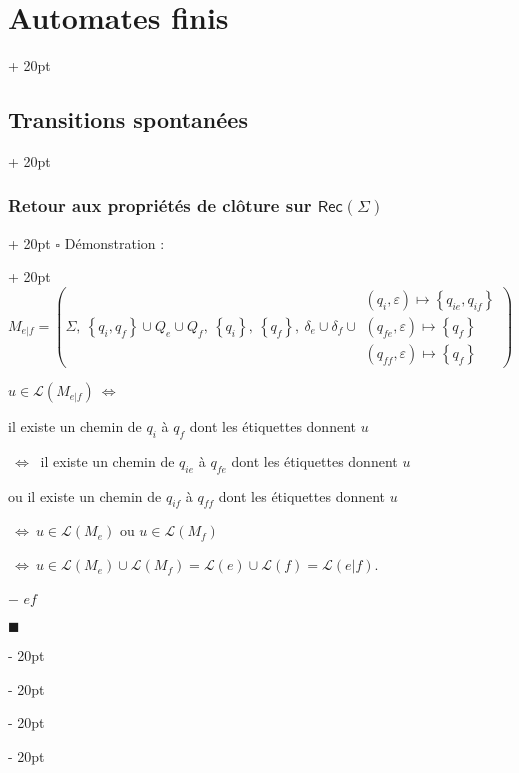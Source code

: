 \documentclass[a4paper, 12pt, twoside]{article}
\newcommand{\lr}[1]{\left( #1 \right)}
\newcommand{\set}[1]{\left\{ #1 \right\}}
\newcommand{\ssi}{\ \Leftrightarrow \ }
\newcommand{\ind}[1][20pt]{\advance\leftskip + #1}
\newcommand{\deind}[1][20pt]{\advance\leftskip - #1}
\newenvironment{indt}[2][20pt]{#2 \par \ind[#1]}{\par \deind} %
\newenvironment{proof}[1][{Démonstration :}]{\begin{indt}{$\square$ #1}}{$\blacksquare$ \end{indt}}
\newcommand{\Rec}[1]{\mathsf{Rec}\!\lr{#1}}
\begin{document}
\begin{indt}{\section{Automates finis}}
\begin{indt}{\subsection{Transitions spontanées}}
\begin{indt}{\subsubsection{Retour aux propriétés de clôture sur $\Rec \Sigma$}}
\begin{proof}
                    $
                        M_{e | f}
                        = \lr{
                            \Sigma,\
                            \set{q_i, q_f} \cup Q_e \cup Q_f,\
                            \set {q_i},\
                            \set {q_f},\
                            \delta_e \cup \delta_f \cup
                            \begin{array}{|l}
                                (q_i, \varepsilon) \longmapsto \set{q_{ie}, q_{if}}
                                \\
                                (q_{fe}, \varepsilon) \longmapsto \set{q_f}
                                \\
                                (q_{ff}, \varepsilon) \longmapsto \set{q_f}
                            \end{array}
                        }
                    $

                    $u \in \mathcal L(M_{e | f}) \ssi$

                    il existe un chemin de $q_i$ à $q_f$ dont les étiquettes donnent $u$

                    $\ssi$ il existe un chemin de $q_{ie}$ à $q_{fe}$ dont les étiquettes donnent $u$

                    ou il existe un chemin de $q_{if}$ à $q_{ff}$ dont les étiquettes donnent $u$

                    $\ssi u \in \mathcal L(M_e)$ ou $u \in \mathcal L(M_f)$

                    $\ssi u \in \mathcal L(M_e) \cup \mathcal L(M_f) = \mathcal L(e) \cup \mathcal L(f) = \mathcal L(e|f)$.

                    \vspace{12pt}
                    
                    $-$ $ef$

                    \begin{center}
\end{center}
\end{proof}
\end{indt}
\end{indt}
\end{indt}
\end{document}
